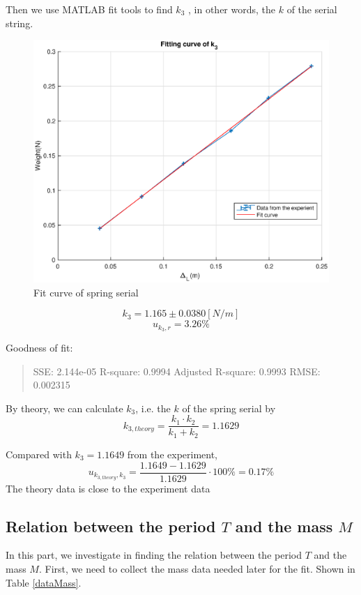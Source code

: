 Then we use MATLAB fit tools to find $k_3$ , in other words, the $k$ of the serial string.

\begin{figure}[H]
	\centering
	\includegraphics[width=15cm]{matlab/fitfig/k3}
	\caption{Fit curve of spring serial}
\end{figure}

$$k_3 = 1.165 \pm 0.0380 [N/m] $$
$$ u_{k_3,r} = 3.26 \% $$

Goodness of fit:
\begin{quote}
	\centering
	SSE: 2.144e-05
	R-square: 0.9994
	Adjusted R-square: 0.9993
	RMSE: 0.002315 
\end{quote}


By theory, we can calculate $k_3$, i.e. the $k$ of the spring serial by 
$$ k_{3,theory} = \frac{k_1 \cdot k_2 }{k_1 + k_2} =  1.1629 $$ 

Compared with $k_3 = 1.1649$  from the experiment,
$$ u_{k_{3,theory},k_3} = \frac{1.1649 - 1.1629}{1.1629} \cdot 100 \%  = 0.17 \% $$ 
The theory data is close to the experiment data

\subsection{Relation between the period $T$ and the mass $M$}

In this part, we investigate in finding the relation between the period $T$ and 
the mass $M$.
First, we need to collect the mass data needed later for the fit. Shown in Table \ref{dataMass}.

